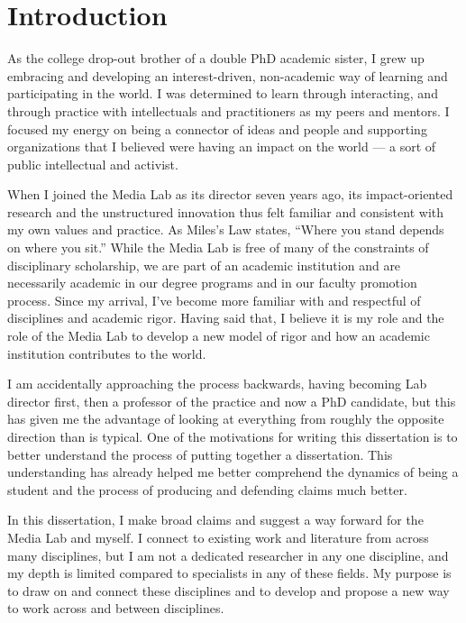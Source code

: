 
\chapter{Introduction} 
\label{chap:introduction} 

As the college drop-out brother of a double PhD academic sister, I grew up embracing and developing an interest-driven, non-academic way of learning and participating in the world. I was determined to learn through interacting, and through practice with intellectuals and practitioners as my peers and mentors. I focused my energy on being a connector of ideas and people and supporting organizations that I believed were having an impact on the world --- a sort of public intellectual and activist.

When I joined the Media Lab as its director seven years ago, its impact-oriented research and the unstructured innovation thus felt familiar and consistent with my own values and practice. As Miles's Law \cite{miles1978origin} states, ``Where you stand depends on where you sit.'' While the Media Lab is free of many of the constraints of disciplinary scholarship, we are part of an academic institution and are necessarily academic in our degree programs and in our faculty promotion process. Since my arrival, I've become more familiar with and respectful of disciplines and academic rigor. Having said that, I believe it is my role and the role of the Media Lab to develop a new model of rigor and how an academic institution contributes to the world.

I am accidentally approaching the process backwards, having becoming Lab director first, then a professor of the practice and now a PhD candidate, but this has given me the advantage of looking at everything from roughly the opposite direction than is typical. One of the motivations for writing this dissertation is to better understand the process of putting together a dissertation. This understanding has already helped me better comprehend the dynamics of being a student and the process of producing and defending claims much better.

In this dissertation, I make broad claims and suggest a way forward for the Media Lab and myself. I connect to existing work and literature from across many disciplines, but I am not a dedicated researcher in any one discipline, and my depth is limited compared to specialists in any of these fields. My purpose is to draw on and connect these disciplines and to develop and propose a new way to work across and between disciplines.

